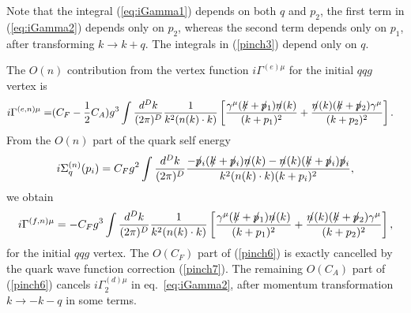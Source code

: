 \documentclass[preprint,amsmath,amssymb,superscriptaddress, floatfix,nofootinbib]{revtex4}
\def\psla{p\kern-.45em/}
\def\ksla{k\kern-.45em/}
\def\nsla{n\kern-.45em/}
\begin{document}
%
Note that the integral (\ref{eq:iGamma1}) depends on 
both $q$ and $p_2$, the first term in (\ref{eq:iGamma2}) 
depends only on $p_2$, whereas the second term depends 
only on $p_1$, after transforming $k\to k+q$. 
The integrals in (\ref{pinch3}) depend only on $q$. 

The $O(n)$ contribution from 
the vertex function $i\Gamma^{(e)\mu}$ for 
the initial $q{q}g$ vertex is 
%
\begin{align}
i\Gamma^{(e,n)\mu} = & (C_F - \frac{1}{2} C_A) g^3 \int \frac{d^D k}{(2\pi)^D} 
\frac{1}{k^2(n(k)\cdot k)} \left[ 
\frac{ \gamma^{\mu}(\ksla+\psla_1)\nsla(k)}{(k+p_1)^2} + 
\frac{ \nsla(k)(\ksla+\psla_2)\gamma^{\mu} }{(k+p_2)^2} \right].
\label{pinch6}
\end{align}
%
From the $O(n)$ part of the quark self energy 
\begin{equation}
i\Sigma_q^{(n)}(p_i) = C_F g^2 \int \frac{d^D k}{(2\pi)^D} 
\frac{-\psla_i(\ksla+\psla_i)\nsla(k)  -\nsla(k)(\ksla+\psla_i)\psla_i }
{k^2(n(k)\cdot k)(k+p_i)^2} , 
\end{equation}
we obtain 
\begin{equation}
i\Gamma^{(f,n)\mu} = - C_F g^3 \int \frac{d^D k}{(2\pi)^D} 
\frac{1}{k^2(n(k)\cdot k)} \left[ 
\frac{\gamma^{\mu}(\ksla+\psla_1)\nsla(k)}{(k+p_1)^2} 
+\frac{\nsla(k)(\ksla+\psla_2)\gamma^{\mu}}{(k+p_2)^2} 
\right] ,
\label{pinch7}
\end{equation}
for the initial $qqg$ vertex. 
The $O(C_F)$ part of (\ref{pinch6}) is exactly cancelled by 
the quark wave function correction (\ref{pinch7}). 
The remaining $O(C_A)$ part of (\ref{pinch6}) cancels 
$i\Gamma^{(d)\mu}_2$ in eq.~\eqref{eq:iGamma2}, after momentum transformation 
$k\to -k-q$ in some terms. 
\end{document}
